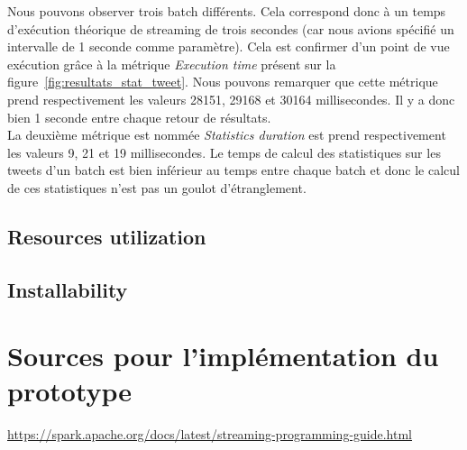     Nous pouvons observer trois batch différents. Cela correspond donc à un temps d'exécution théorique de streaming de trois secondes (car nous avions spécifié un intervalle de 1 seconde comme paramètre). Cela est confirmer d'un point de vue exécution grâce à la métrique \emph{Execution time} présent sur la figure~\ref{fig:resultats_stat_tweet}. Nous pouvons remarquer que cette métrique prend respectivement les valeurs 28151, 29168 et 30164 millisecondes. Il y a donc bien 1 seconde entre chaque retour de résultats. \\

    La deuxième métrique est nommée \emph{Statistics duration} est prend respectivement les valeurs 9, 21 et 19 millisecondes. Le temps de calcul des statistiques sur les tweets d'un batch est bien inférieur au temps entre chaque batch et donc le calcul de ces statistiques n'est pas un goulot d'étranglement.

  \subsection{Resources utilization}

  \subsection{Installability}

\section{Sources pour l'implémentation du prototype}
  \url{https://spark.apache.org/docs/latest/streaming-programming-guide.html}
